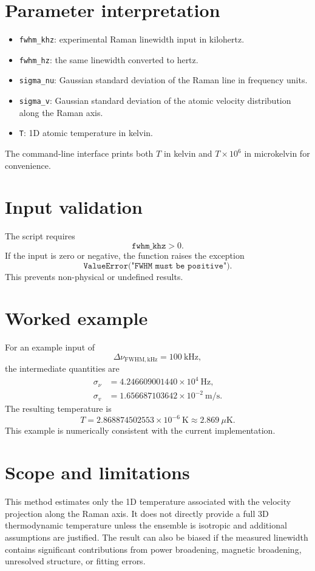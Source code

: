 \documentclass[11pt]{article}
\begin{document}
\section{Parameter interpretation}
\begin{itemize}
    \item \texttt{fwhm\_khz}: experimental Raman linewidth input in kilohertz.
    \item \texttt{fwhm\_hz}: the same linewidth converted to hertz.
    \item \texttt{sigma\_nu}: Gaussian standard deviation of the Raman line in frequency units.
    \item \texttt{sigma\_v}: Gaussian standard deviation of the atomic velocity distribution along the Raman axis.
    \item \texttt{T}: 1D atomic temperature in kelvin.
\end{itemize}
The command-line interface prints both $T$ in kelvin and $T \times 10^6$ in microkelvin for convenience.

\section{Input validation}
The script requires
\begin{equation}
\texttt{fwhm\_khz} > 0.
\end{equation}
If the input is zero or negative, the function raises the exception
\begin{equation}
\texttt{ValueError("FWHM must be positive")}. 
\end{equation}
This prevents non-physical or undefined results.

\section{Worked example}
For an example input of
\begin{equation}
\Delta \nu_{\mathrm{FWHM,kHz}} = 100\ \mathrm{kHz},
\end{equation}
the intermediate quantities are
\begin{align}
\sigma_\nu &= 4.246609001440 \times 10^4\ \mathrm{Hz}, \\
\sigma_v &= 1.656687103642 \times 10^{-2}\ \mathrm{m/s}.
\end{align}
The resulting temperature is
\begin{equation}
T = 2.868874502553 \times 10^{-6}\ \mathrm{K} \approx 2.869\ \mu\mathrm{K}.
\end{equation}
This example is numerically consistent with the current implementation.

\section{Scope and limitations}
This method estimates only the 1D temperature associated with the velocity projection along the Raman axis. It does not directly provide a full 3D thermodynamic temperature unless the ensemble is isotropic and additional assumptions are justified. The result can also be biased if the measured linewidth contains significant contributions from power broadening, magnetic broadening, unresolved structure, or fitting errors.
\end{document}
